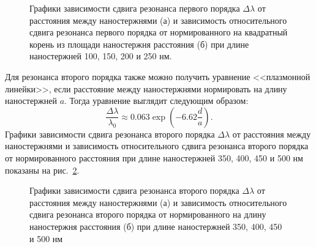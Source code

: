 \begin{figure}
\caption{Графики зависимости сдвига резонанса первого порядка $ \Delta \lambda $ от расстояния между наностержнями (а) и зависимость относительного сдвига резонанса первого порядка от нормированного на квадратный корень из площади наностержня расстояния (б) при длине наностержней 100, 150, 200 и 250 нм. }
\label{img:ruler1}
\end{figure}

Для резонанса второго порядка также можно получить уравнение <<плазмонной линейки>>, если расстояние между наностержнями нормировать на длину наностержней $ a $. Тогда уравнение выглядит следующим образом:
\begin{equation}
\frac{\Delta \lambda}{\lambda_0} \approx 0.063 \exp \left( - 6.62 \frac{d}{a} \right).
\end{equation}
Графики зависимости сдвига резонанса второго порядка $ \Delta \lambda $ от расстояния между наностержнями и зависимость относительного сдвига резонанса второго порядка от нормированного расстояния при длине наностержней 350, 400, 450 и 500 нм показаны на рис.~\ref{img:ruler2}.

\begin{figure}
\caption{Графики зависимости сдвига резонанса второго порядка $ \Delta \lambda $ от расстояния между наностержнями (а) и зависимость относительного сдвига резонанса второго порядка от нормированного на длину  наностержня расстояния (б) при длине наностержней 350, 400, 450 и 500 нм }
\label{img:ruler2}
\end{figure}

